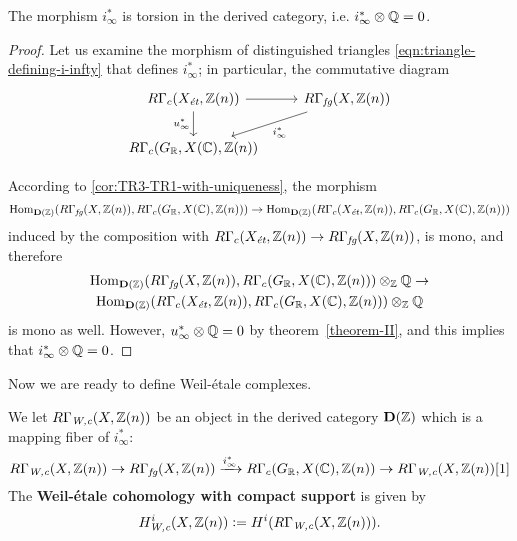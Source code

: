 \documentclass{article}
\numberwithin{equation}{section}
\begin{document}
\begin{proposition}
  \label{i-infty-is-torsion}
  The morphism $i_\infty^*$ is torsion in the derived category,
  i.e. $i_\infty^*\otimes \QQ = 0$.

  \begin{proof}
    Let us examine the morphism of distinguished triangles
    \eqref{eqn:triangle-defining-i-infty} that defines $i_\infty^*$; in
    particular, the commutative diagram
    \[ \begin{tikzcd}
      R\Gamma_c (X_\et, \ZZ (n)) \ar{r}\ar{d}[swap]{u_\infty^*} & R\Gamma_\fg (X, \ZZ (n))\ar{dl}{i_\infty^*} \\
      R\Gamma_c (G_\RR, X (\CC), \ZZ (n))
    \end{tikzcd} \]

    According to \ref{cor:TR3-TR1-with-uniqueness}, the morphism
    \[ \Hom_{\mathbf{D} (\ZZ)} (R\Gamma_\fg (X,\ZZ (n)), R\Gamma_c (G_\RR, X (\CC), \ZZ (n))) \to
    \Hom_{\mathbf{D} (\ZZ)} (R\Gamma_c (X_\et, \ZZ (n)), R\Gamma_c (G_\RR, X (\CC), \ZZ (n))) \]
    induced by the composition with
    $R\Gamma_c (X_\et, \ZZ (n)) \to R\Gamma_\fg (X,\ZZ (n))$, is mono, and
    therefore
    \begin{multline*}
      \Hom_{\mathbf{D} (\ZZ)} (R\Gamma_\fg (X,\ZZ (n)), R\Gamma_c (G_\RR, X (\CC), \ZZ (n)))\otimes_\ZZ \QQ \to\\
      \Hom_{\mathbf{D} (\ZZ)} (R\Gamma_c (X_\et, \ZZ (n)), R\Gamma_c (G_\RR, X (\CC), \ZZ (n)))\otimes_\ZZ \QQ
    \end{multline*}
    is mono as well. However, $u_\infty^*\otimes \QQ = 0$ by
    theorem~\ref{theorem-II}, and this implies that $i_\infty^*\otimes \QQ = 0$.
  \end{proof}
\end{proposition}

Now we are ready to define Weil-étale complexes.

\begin{definition}
  \label{dfn:RGammaWc}
  We let
  $R\Gamma_\Wc (X,\ZZ(n))$ be an object in the derived category
  $\mathbf{D} (\ZZ)$ which is a mapping fiber of $i_\infty^*$:
  \[ R\Gamma_\Wc (X,\ZZ(n)) \to
  R\Gamma_\fg (X, \ZZ (n)) \xrightarrow{i_\infty^*}
  R\Gamma_c (G_\RR, X (\CC), \ZZ (n)) \to
  R\Gamma_\Wc (X,\ZZ(n)) [1] \]
  The \textbf{Weil-étale cohomology with compact support} is given by
  $$H_\Wc^i (X, \ZZ (n)) \dfn H^i (R\Gamma_\Wc (X,\ZZ(n))).$$
\end{definition}
\end{document}
